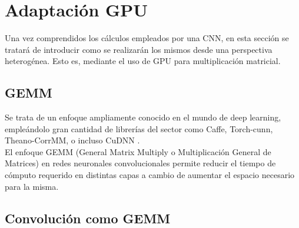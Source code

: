 \chapter{Adaptación GPU}

Una vez comprendidos los cálculos empleados por una CNN, en esta sección se tratará de introducir como se realizarán los mismos desde una perspectiva heterogénea. Esto es, mediante el uso de GPU para multiplicación matricial.

\section{GEMM}

Se trata de un enfoque ampliamente conocido en el mundo de deep learning, empleándolo gran cantidad de librerías del sector como Caffe, Torch-cunn, Theano-CorrMM, o incluso CuDNN \cite{conv_GEMM_FFT_comparacion}. \\
El enfoque GEMM (General Matrix Multiply o Multiplicación General de Matrices) en redes neuronales convolucionales permite reducir el tiempo de cómputo requerido en distintas capas a cambio de aumentar el espacio necesario para la misma. 

\section{Convolución como GEMM \label{Intro_GEMMM}}

